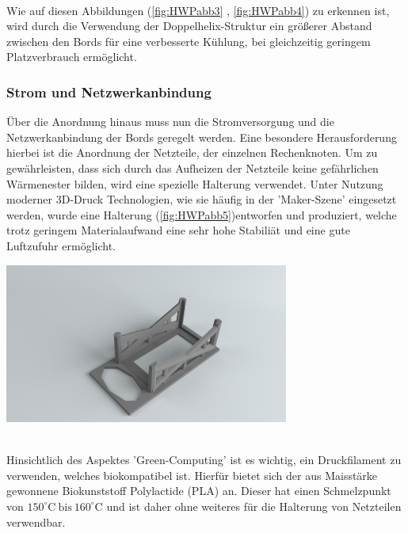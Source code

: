 ~\\
Wie auf diesen Abbildungen (\ref{fig:HWPabb3} , \ref{fig:HWPabb4}) zu erkennen ist, wird durch die Verwendung der Doppelhelix-Struktur
ein größerer Abstand zwischen den Bords für eine verbesserte Kühlung, bei gleichzeitig geringem
Platzverbrauch ermöglicht.\\ 
\subsubsection{Strom und Netzwerkanbindung}
Über die Anordnung hinaus muss nun die Stromversorgung und die Netzwerkanbindung
der Bords geregelt werden. Eine besondere Herausforderung hierbei ist die 
Anordnung der Netzteile, der einzelnen Rechenknoten. 
Um zu gewährleisten, dass sich durch das Aufheizen der Netzteile keine gefährlichen
Wärmenester bilden, wird eine spezielle Halterung verwendet.
Unter Nutzung moderner 3D-Druck Technologien, wie sie häufig in der 'Maker-Szene' eingesetzt werden,
wurde eine Halterung (\ref{fig:HWPabb5})entworfen und produziert, welche trotz geringem Materialaufwand eine sehr hohe Stabiliät 
und eine gute Luftzufuhr ermöglicht.~\\
\begin{minipage}{\textwidth}
\begin{center}
	\includegraphics[width=0.7\textwidth]{./Bilder/Server-Aufbau/RenderPowerSupplyBox30.png}
	\label{fig:HWPabb5}

\end{center}	
\end{minipage}
~\\

Hinsichtlich des Aspektes 'Green-Computing' ist es wichtig, ein Druckfilament zu verwenden, 
welches biokompatibel ist. Hierfür bietet sich der aus Maisstärke gewonnene Biokunststoff Polylactide (PLA) an.
Dieser hat einen Schmelzpunkt von $150^\circ\text{C}~\text{bis}~160^\circ \text{C}$
und ist daher ohne weiteres für die Halterung von Netzteilen verwendbar.


